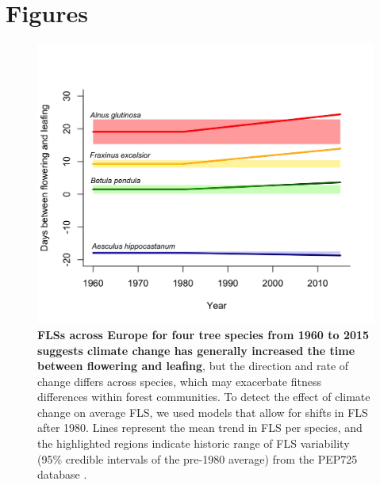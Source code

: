 \documentclass{article}
\begin{document}
\section*{Figures}
\begin{figure}[ht]
    \centering
 \includegraphics[width=\textwidth]{..//PEP725/FLS_climate_change.jpeg} 
    \caption{\textbf{FLSs across Europe for four tree species from 1960 to 2015 suggests climate change has generally increased the time between flowering and leafing}, but the direction and rate of change differs across species, which may exacerbate fitness differences within forest communities. To detect the effect of climate change on average FLS, we used models that allow for shifts in FLS after 1980. Lines represent the mean trend in FLS per species, and the highlighted regions indicate historic range of FLS variability (95\% credible intervals of the pre-1980 average) from the PEP725 database \citep{PEP725}.}
    \label{fig:climchange}
\end{figure}
\end{document}
